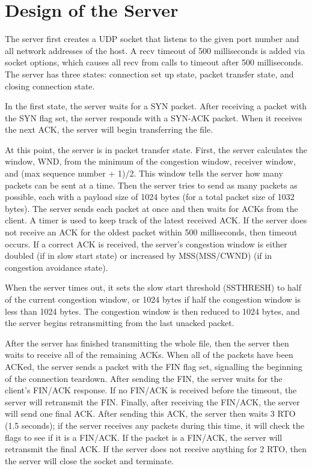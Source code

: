 \documentclass{article}
\begin{document}
\section{Design of the Server}
    The server first creates a UDP socket that listens to the given port number
    and all network addresses of the host. A recv timeout of 500 milliseconds
    is added via socket options, which causes all recv from calls to timeout
    after 500 milliseconds. The server has three states: connection set up
    state, packet transfer state, and closing connection state.

    In the first state, the server waits for a SYN packet. After receiving a
    packet with the SYN flag set, the server responds with a SYN-ACK packet.
    When it receives the next ACK, the server will begin transferring the file.

    At this point, the server is in packet transfer state. First, the server
    calculates the window, WND, from the minimum of the congestion window,
    receiver window, and (max sequence number + 1)/2. This window tells the
    server how many packets can be sent at a time. Then the server tries to
    send as many packets as possible, each with a payload size of 1024 bytes
    (for a total packet size of 1032 bytes). The server sends each packet at
    once and then waits for ACKs from the client. A timer is used to keep track
    of the latest received ACK. If the server does not receive an ACK for the
    oldest packet within 500 milliseconds, then timeout occurs. If a correct
    ACK is received, the server's congestion window is either doubled (if in
    slow start state) or increased by MSS(MSS/CWND) (if in congestion avoidance
    state).

    When the server times out, it sets the slow start threshold (SSTHRESH) to
    half of the current congestion window, or 1024 bytes if half the congestion
    window is less than 1024 bytes. The congestion window is then reduced to
    1024 bytes, and the server begins retransmitting from the last unacked
    packet.

    After the server has finished transmitting the whole file, then the server
    then waits to receive all of the remaining ACKs. When all of the packets
    have been ACKed, the server sends a packet with the FIN flag set,
    signalling the beginning of the connection teardown. After sending the FIN,
    the server waits for the client's FIN/ACK response. If no FIN/ACK is
    received before the timeout, the server will retransmit the FIN. Finally,
    after receiving the FIN/ACK, the server will send one final ACK. After
    sending this ACK, the server then waits 3 RTO (1.5 seconds); if the server
    receives any packets during this time, it will check the flags to see if it
    is a FIN/ACK. If the packet is a FIN/ACK, the server will retransmit the
    final ACK. If the server does not receive anything for 2 RTO, then the
    server will close the socket and terminate.
\end{document}
